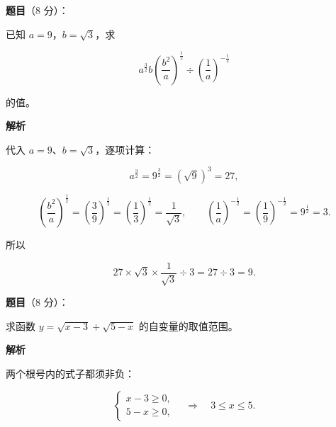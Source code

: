 \begin{answer}

\textbf{题目}（8 分）：

已知 $a=9$，$b=\sqrt{3}$，求

\nopagebreak[4]
\[
a^{\frac{3}{2}}b\left(\frac{b^2}{a}\right)^{\frac{1}{2}}\div\left(\frac{1}{a}\right)^{-\frac{1}{2}}
\]

的值。

\textbf{解析}

代入 $a=9$、$b=\sqrt{3}$，逐项计算：

\nopagebreak[4]
\[
a^{\frac{3}{2}}=9^{\frac{3}{2}}=(\sqrt{9})^3=27,
\]

\nopagebreak[4]
\[
\left(\frac{b^2}{a}\right)^{\frac{1}{2}}=\left(\frac{3}{9}\right)^{\frac{1}{2}}=\left(\frac{1}{3}\right)^{\frac{1}{2}}=\frac{1}{\sqrt{3}},
\qquad
\left(\frac{1}{a}\right)^{-\frac{1}{2}}=\left(\frac{1}{9}\right)^{-\frac{1}{2}}=9^{\frac{1}{2}}=3.
\]

所以

\nopagebreak[4]
\[
27\times\sqrt{3}\times\frac{1}{\sqrt{3}}\div3=27\div3=9.
\]


\end{answer}
\begin{answer}

\textbf{题目}（8 分）：

求函数 $y=\sqrt{x-3}+\sqrt{5-x}$ 的自变量的取值范围。

\textbf{解析}

两个根号内的式子都须非负：

\nopagebreak[4]
\[
\begin{cases}
x-3\ge0,\\
5-x\ge0,
\end{cases}
\quad\Longrightarrow\quad
3\le x\le5.
\]


\end{answer}
